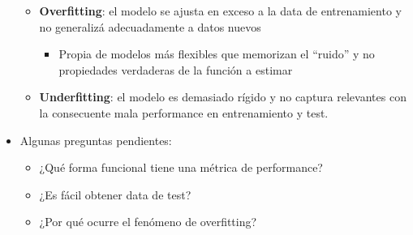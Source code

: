 \documentclass[leqno, 10pt, envcountsect]{beamer}
\numberwithin{equation}{section}
\theoremstyle{definition}
\theoremstyle{example}
\numberwithin{figure}{section}
\numberwithin{table}{section}
\let\olditem\item
\renewcommand{\item}{%
\olditem\vspace{1pt}}
\begin{document}
\begin{frame}[fragile=singleslide]
\begin{itemize}
\begin{itemize}
            \item \textbf{Overfitting}: el modelo se ajusta en exceso a la data
              de entrenamiento y no generalizá adecuadamente a datos nuevos
              \begin{itemize}
                \item Propia de modelos más flexibles que memorizan el
                  \enquote{ruido} y no propiedades verdaderas de la función a
                  estimar
              \end{itemize}
            \item \textbf{Underfitting}: el modelo es demasiado rígido y no
              captura relevantes con la consecuente mala performance en
              entrenamiento y test.
        \end{itemize}
    \item Algunas preguntas pendientes:
      \begin{itemize}
    \item ¿Qué forma funcional tiene una métrica de performance?
    \item ¿Es fácil obtener data de test?
    \item ¿Por qué ocurre el fenómeno de overfitting?
      \end{itemize}
  \end{itemize}
\end{frame}
\end{document}
